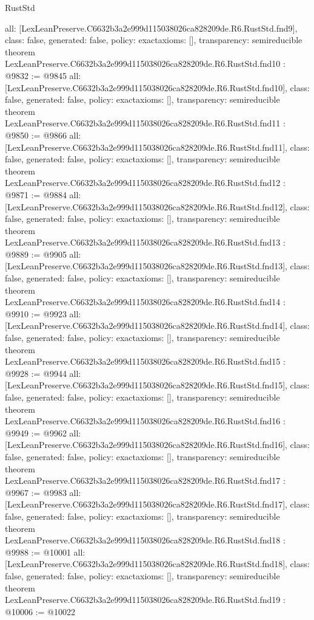 \begin{lexlean}{RustStd}
\begin{coremodule}
{  all: [LexLeanPreserve.C6632b3a2e999d115038026ca828209de.R6.RustStd.fnd9],
  class: false,
  generated: false,
  policy: exact{axioms: []},
  transparency: semireducible
}
theorem LexLeanPreserve.C6632b3a2e999d115038026ca828209de.R6.RustStd.fnd10 : @9832 := @9845 {
  all: [LexLeanPreserve.C6632b3a2e999d115038026ca828209de.R6.RustStd.fnd10],
  class: false,
  generated: false,
  policy: exact{axioms: []},
  transparency: semireducible
}
theorem LexLeanPreserve.C6632b3a2e999d115038026ca828209de.R6.RustStd.fnd11 : @9850 := @9866 {
  all: [LexLeanPreserve.C6632b3a2e999d115038026ca828209de.R6.RustStd.fnd11],
  class: false,
  generated: false,
  policy: exact{axioms: []},
  transparency: semireducible
}
theorem LexLeanPreserve.C6632b3a2e999d115038026ca828209de.R6.RustStd.fnd12 : @9871 := @9884 {
  all: [LexLeanPreserve.C6632b3a2e999d115038026ca828209de.R6.RustStd.fnd12],
  class: false,
  generated: false,
  policy: exact{axioms: []},
  transparency: semireducible
}
theorem LexLeanPreserve.C6632b3a2e999d115038026ca828209de.R6.RustStd.fnd13 : @9889 := @9905 {
  all: [LexLeanPreserve.C6632b3a2e999d115038026ca828209de.R6.RustStd.fnd13],
  class: false,
  generated: false,
  policy: exact{axioms: []},
  transparency: semireducible
}
theorem LexLeanPreserve.C6632b3a2e999d115038026ca828209de.R6.RustStd.fnd14 : @9910 := @9923 {
  all: [LexLeanPreserve.C6632b3a2e999d115038026ca828209de.R6.RustStd.fnd14],
  class: false,
  generated: false,
  policy: exact{axioms: []},
  transparency: semireducible
}
theorem LexLeanPreserve.C6632b3a2e999d115038026ca828209de.R6.RustStd.fnd15 : @9928 := @9944 {
  all: [LexLeanPreserve.C6632b3a2e999d115038026ca828209de.R6.RustStd.fnd15],
  class: false,
  generated: false,
  policy: exact{axioms: []},
  transparency: semireducible
}
theorem LexLeanPreserve.C6632b3a2e999d115038026ca828209de.R6.RustStd.fnd16 : @9949 := @9962 {
  all: [LexLeanPreserve.C6632b3a2e999d115038026ca828209de.R6.RustStd.fnd16],
  class: false,
  generated: false,
  policy: exact{axioms: []},
  transparency: semireducible
}
theorem LexLeanPreserve.C6632b3a2e999d115038026ca828209de.R6.RustStd.fnd17 : @9967 := @9983 {
  all: [LexLeanPreserve.C6632b3a2e999d115038026ca828209de.R6.RustStd.fnd17],
  class: false,
  generated: false,
  policy: exact{axioms: []},
  transparency: semireducible
}
theorem LexLeanPreserve.C6632b3a2e999d115038026ca828209de.R6.RustStd.fnd18 : @9988 := @10001 {
  all: [LexLeanPreserve.C6632b3a2e999d115038026ca828209de.R6.RustStd.fnd18],
  class: false,
  generated: false,
  policy: exact{axioms: []},
  transparency: semireducible
}
theorem LexLeanPreserve.C6632b3a2e999d115038026ca828209de.R6.RustStd.fnd19 : @10006 := @10022 {
}
\end{coremodule}
\end{lexlean}
